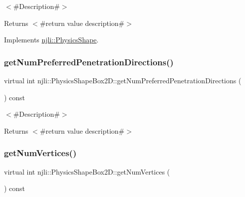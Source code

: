 $<$\#\+Description\#$>$

\begin{DoxyReturn}{Returns}
$<$\#return value description\#$>$ 
\end{DoxyReturn}


Implements \mbox{\hyperlink{classnjli_1_1_physics_shape_a11cb80220393bfce177b8bdc34f7f359}{njli\+::\+Physics\+Shape}}.

\mbox{\label{classnjli_1_1_physics_shape_box2_d_a1f43866f98bef22ba0fd9b30c1eee161}} 
\subsubsection{\texorpdfstring{get\+Num\+Preferred\+Penetration\+Directions()}{getNumPreferredPenetrationDirections()}}
{\footnotesize\ttfamily virtual int njli\+::\+Physics\+Shape\+Box2\+D\+::get\+Num\+Preferred\+Penetration\+Directions (\begin{DoxyParamCaption}{ }\end{DoxyParamCaption}) const\hspace{0.3cm}{\ttfamily [virtual]}}

$<$\#\+Description\#$>$

\begin{DoxyReturn}{Returns}
$<$\#return value description\#$>$ 
\end{DoxyReturn}
\mbox{\label{classnjli_1_1_physics_shape_box2_d_ab6b86970a80827d5ea8620dbb080023f}} 
\subsubsection{\texorpdfstring{get\+Num\+Vertices()}{getNumVertices()}}
{\footnotesize\ttfamily virtual int njli\+::\+Physics\+Shape\+Box2\+D\+::get\+Num\+Vertices (\begin{DoxyParamCaption}{ }\end{DoxyParamCaption}) const\hspace{0.3cm}{\ttfamily [virtual]}}

